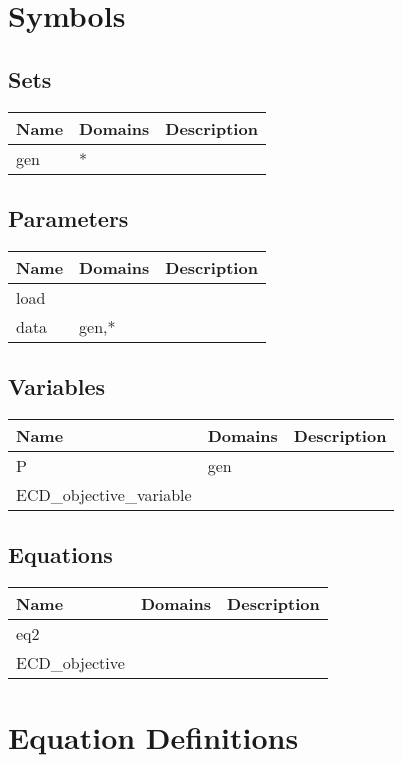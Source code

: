 \documentclass[11pt]{article}
\begin{document}
\section*{Symbols}


\subsection*{Sets}
\begin{tabularx}{\textwidth}{| l | l | X |}
\hline
\textbf{Name} & \textbf{Domains} & \textbf{Description}\\
\hline
\endhead

gen & * & \\
\hline
\end{tabularx}
\subsection*{Parameters}
\begin{tabularx}{\textwidth}{| l | l | X |}
\hline
\textbf{Name} & \textbf{Domains} & \textbf{Description}\\
\hline
\endhead

load &  & \\
data & gen,* & \\
\hline
\end{tabularx}
\subsection*{Variables}
\begin{tabularx}{\textwidth}{| l | l | X |}
\hline
\textbf{Name} & \textbf{Domains} & \textbf{Description}\\
\hline
\endhead

P & gen & \\
ECD\_objective\_variable &  & \\
\hline
\end{tabularx}
\subsection*{Equations}
\begin{tabularx}{\textwidth}{| l | l | X |}
\hline
\textbf{Name} & \textbf{Domains} & \textbf{Description}\\
\hline
\endhead

eq2 &  & \\
ECD\_objective &  & \\
\hline
\end{tabularx}
\section*{Equation Definitions}
\end{document}
